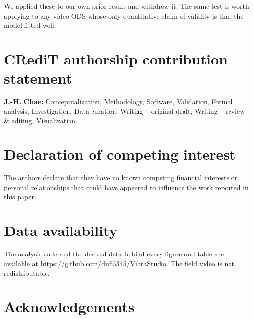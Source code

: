 \documentclass[preprint,12pt]{elsarticle}
\begin{document}
We applied these to our own prior result and withdrew it. The same test is
worth applying to any video ODS whose only quantitative claim of validity is
that the model fitted well.

\section*{CRediT authorship contribution statement}

\textbf{J.-H. Chae:} Conceptualization, Methodology, Software, Validation,
Formal analysis, Investigation, Data curation, Writing -- original draft,
Writing -- review \& editing, Visualization.

\section*{Declaration of competing interest}

The authors declare that they have no known competing financial interests or
personal relationships that could have appeared to influence the work
reported in this paper.

\section*{Data availability}

The analysis code and the derived data behind every figure and table are
available at \url{https://github.com/dnfl5345/VibraStudio}. The field video
is not redistributable.

\section*{Acknowledgements}




\end{document}
